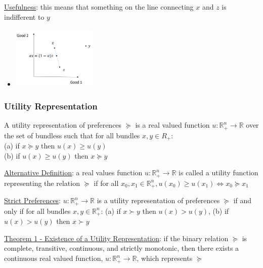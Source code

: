 \documentclass{article}
\begin{document}
  \par
  \underline{Usefulness}: this means that something on the line connecting $x$ and $z$ is indifferent to $y$
  \begin{itemize}
    \item  \includegraphics[width=4cm, height=3cm]{pic9}
  \end{itemize}
  \par
\vspace{6mm}
\subsubsection{Utility Representation}
A utility representation of preferences $\succeq$ is a real valued function $u: \mathbb{R}_{+}^{n} \rightarrow \mathbb{R}$ over the set of bundless such that for all bundles $x,y \in R_{+}$: \\ (a) if $x \succeq y$ then $u(x) \geq u(y)$ \\ (b) if $u(x) \geq u(y)$ then $x \succeq y$ \par \vspace{0.3em}
  \underline{Alternative Definition}: a real values function $u: \mathbb{R}_{+}^{n} \rightarrow \mathbb{R}$ is called a utility function representing the relation $\succeq$ if for all $x_{0}, x_{1} \in \mathbb{R}_{+}^{n}, u(x_{0}) \geq u(x_{1}) \Longleftrightarrow x_{0} \succeq x_{1}$ \par
  \underline{Strict Preferences}: $u: \mathbb{R}_{+}^{n} \rightarrow \mathbb{R}$ is a utility representation of preferences $\succeq$ if and only if for all bundles $x, y \in \mathbb{R}_{+}^{n}$: (a) if $x \succ y$ then $u(x) > u(y)$, (b) if $u(x) > u(y)$ then $x \succ y$ \par
  \underline{Theorem 1 - Existence of a Utility Representation}: if the binary relation $\succeq$ is complete, transitive, continuous, and strictly monotonic, then there exists a continuous real valued function, $u: \mathbb{R}_{+}^{n} \rightarrow \mathbb{R}$, which represents $\succeq$
\end{document}
